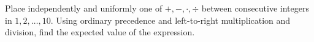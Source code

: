 Place independently and uniformly one of $+,-,\cdot,\div$ between consecutive integers in $1,2,\ldots,10$. Using ordinary precedence and left-to-right multiplication and division, find the expected value of the expression.
